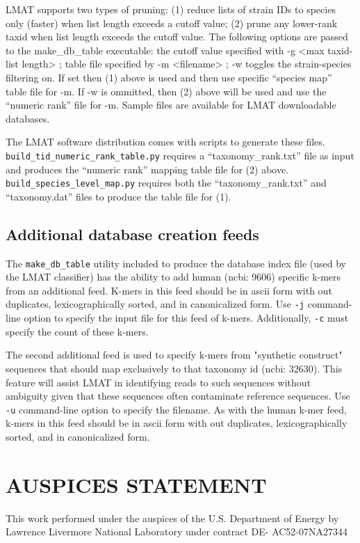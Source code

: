 \documentclass[11pt]{article}
\begin{document}
 LMAT supports two types of pruning: (1) reduce lists of strain IDs to species only (faster) when list length exceeds a cutoff value;  (2) prune any lower-rank taxid when list length exceeds the cutoff value.   The following options are passed to the make\_db\_table executable:
the cutoff value specified with -g <max taxid-list length> ;  table file specified by -m <filename> ; -w toggles the strain-species filtering on.  If set then (1) above is used and then use specific ``species map'' table file for -m.  If -w is ommitted, then (2) above will be used and use the ``numeric rank'' file for -m.  Sample files are available for LMAT downloadable databases.

The LMAT software distribution comes with scripts to generate these files.  \texttt{build_tid_numeric_rank_table.py} requires a ``taxonomy\_rank.txt'' file as input and produces the ``numeric rank'' mapping table file for (2) above.  \texttt{build\_species\_level\_map.py}  requires both the ``taxonomy\_rank.txt'' and  ``taxonomy.dat'' files to  produce the table file for (1).

\subsection{Additional database creation feeds}

The \texttt{make\_db\_table} utility included to produce the database index file (used by the LMAT classifier) has the ability to add human (ncbi: 9606) specific k-mers from an additional feed.  K-mers in this feed should be in ascii form with out duplicates, lexicographically sorted, and in canonicalized form.  Use \texttt{-j} command-line option to specify the input file for this feed of k-mers.  Additionally, \texttt{-c} must specify the count of these k-mers.

The second additional feed is used to specify k-mers from "synthetic construct" sequences that should map exclusively to that taxonomy id (ncbi: 32630).  This feature will assist LMAT in identifying reads to such sequences without ambiguity given that these sequences often contaminate reference sequences.  Use \texttt{-u} command-line option to specify the filename.  As with the human k-mer feed, k-mers in this feed should be in ascii form with out duplicates, lexicographically sorted, and in canonicalized form.

\section{AUSPICES STATEMENT}

This work performed under the auspices of the U.S. Department of
Energy by Lawrence Livermore National Laboratory under contract DE-
AC52-07NA27344
\end{document}
